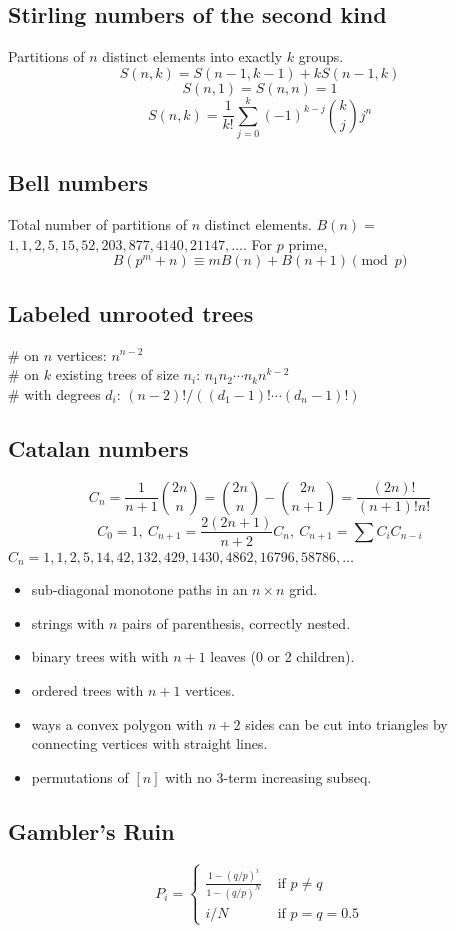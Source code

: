 	\subsection{Stirling numbers of the second kind}
		Partitions of $n$ distinct elements into exactly $k$ groups.
		$$S(n,k) = S(n-1,k-1) + k S(n-1,k)$$
		$$S(n,1) = S(n,n) = 1$$
		$$S(n,k) = \frac{1}{k!}\sum_{j=0}^k (-1)^{k-j}\binom{k}{j}j^n$$

	\subsection{Bell numbers}
		Total number of partitions of $n$ distinct elements. $B(n) =$
		$1, 1, 2, 5, 15, 52, 203, 877, 4140, 21147, \dots$. For $p$ prime,
		\[ B(p^m+n)\equiv mB(n)+B(n+1) \pmod{p} \]

	\subsection{Labeled unrooted trees}
		\# on $n$ vertices: $n^{n-2}$ \\
		\# on $k$ existing trees of size $n_i$: $n_1n_2\cdots n_k n^{k-2}$ \\
		\# with degrees $d_i$: $(n-2)! / ((d_1-1)! \cdots (d_n-1)!)$

	\subsection{Catalan numbers}
		\[ C_n=\frac{1}{n+1}\binom{2n}{n}= \binom{2n}{n}-\binom{2n}{n+1} = \frac{(2n)!}{(n+1)!n!} \]
		\[ C_0=1,\ C_{n+1} = \frac{2(2n+1)}{n+2}C_n,\ C_{n+1}=\sum C_iC_{n-i} \]
		${C_n = 1, 1, 2, 5, 14, 42, 132, 429, 1430, 4862, 16796, 58786, \dots}$
		\begin{itemize}[noitemsep]
			\item sub-diagonal monotone paths in an $n\times n$ grid.
			\item strings with $n$ pairs of parenthesis, correctly nested.
			\item binary trees with with $n+1$ leaves (0 or 2 children).
			\item ordered trees with $n+1$ vertices.
			\item ways a convex polygon with $n+2$ sides can be cut into triangles by connecting vertices with straight lines.
			\item permutations of $[n]$ with no 3-term increasing subseq.
		\end{itemize}

    \subsection{Gambler's Ruin}
    \[
        P_i = \begin{cases}
            \frac{1 - (q/p)^i}{1 - (q/p)^N} & \text{ if $p \neq q$} \\
            i/N & \text{ if $p = q = 0.5$}
        \end{cases}
    \]
